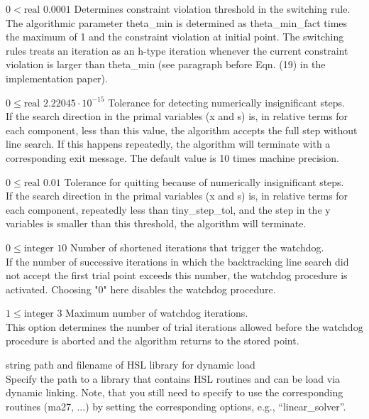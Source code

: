 %
{$0<\textrm{real}$}%
{$0.0001$}%
{Determines constraint violation threshold in the switching rule.\\
The algorithmic parameter theta\_min is determined as theta\_min\_fact times the maximum of 1 and the constraint violation at initial point.  The switching rules treats an iteration as an h-type iteration whenever the current constraint violation is larger than theta\_min (see paragraph before Eqn. (19) in the implementation paper).}%
{}

%
{$0\leq\textrm{real}$}%
{$2.22045 \cdot 10^{-15}$}%
{Tolerance for detecting numerically insignificant steps.\\
If the search direction in the primal variables (x and s) is, in relative terms for each component, less than this value, the algorithm accepts the full step without line search.  If this happens repeatedly, the algorithm will terminate with a corresponding exit message. The default value is 10 times machine precision.}%
{}

%
{$0\leq\textrm{real}$}%
{$0.01$}%
{Tolerance for quitting because of numerically insignificant steps.\\
If the search direction in the primal variables (x and s) is, in relative terms for each component, repeatedly less than tiny\_step\_tol, and the step in the y variables is smaller than this threshold, the algorithm will terminate.}%
{}

%
{$0\leq\textrm{integer}$}%
{$10$}%
{Number of shortened iterations that trigger the watchdog.\\
If the number of successive iterations in which the backtracking line search did not accept the first trial point exceeds this number, the watchdog procedure is activated.  Choosing "0" here disables the watchdog procedure.}%
{}

%
{$1\leq\textrm{integer}$}%
{$3$}%
{Maximum number of watchdog iterations.\\
This option determines the number of trial iterations allowed before the watchdog procedure is aborted and the algorithm returns to the stored point.}%
{}

%
{string}%
{}%
{path and filename of HSL library for dynamic load\\
Specify the path to a library that contains HSL routines and can be load via dynamic linking. Note, that you still need to specify to use the corresponding routines (ma27, ...) by setting the corresponding options, e.g., ``linear\_solver''.}%
{}


